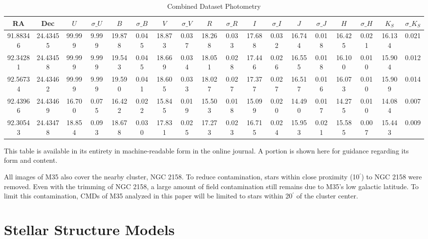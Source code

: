 \documentclass[iop]{emulateapj}
\begin{document}
\begin{table}\tiny
\caption{Combined Dataset Photometry \label{tab:stubtable}}
\begin{tabular}{cccccccccccccccccc}
RA & Dec & $U$ & $\sigma\_U$ & $B$ & $\sigma\_B$ & $V$ & $\sigma\_V$ & $R$ & $\sigma\_R$ & $I$ & $\sigma\_I$ & $J$ & $\sigma\_J$ & $H$ & $\sigma\_H$ & $K_S$ & $\sigma\_K_S$ \\ \hline
   91.88346  &   24.43455 & 99.999 &  9.999 & 19.878 &  0.045 & 18.873 &  0.037 & 18.268 &  0.033 & 17.688 &  0.032 & 16.744 &  0.018 & 16.425 &  0.021 & 16.134 &  0.021 \\
   92.34281  &   24.43458 & 99.999 &  9.999 & 19.543 &  0.045 & 18.669 &  0.034 & 18.051 &  0.028 & 17.446 &  0.026 & 16.555 &  0.018 & 16.100 &  0.010 & 15.904 &  0.012 \\
   92.56734  &   24.43462 & 99.999 &  9.999 & 19.590 &  0.041 & 18.605 &  0.033 & 18.027 &  0.027 & 17.377 &  0.027 & 16.517 &  0.016 & 16.073 &  0.010 & 15.909 &  0.014 \\
   92.43966  &   24.43469 & 16.700 &  0.075 & 16.422 &  0.022 & 15.845 &  0.019 & 15.503 &  0.018 & 15.099 &  0.020 & 14.490 &  0.017 & 14.275 &  0.010 & 14.084 &  0.007 \\
   92.30543  &   24.43478 & 18.854 &  0.093 & 18.678 &  0.030 & 17.831 &  0.025 & 17.273 &  0.023 & 16.715 &  0.024 & 15.953 &  0.021 & 15.585 &  0.007 & 15.443 &  0.009 \\ \hline
\end{tabular}
{\scriptsize This table is available in its entirety in machine-readable form in the online journal. A portion is shown here for guidance regarding its form and content.}
\end{table}

All images of M35 also cover the nearby cluster, NGC 2158. To reduce contamination, stars within close proximity (10$^\prime$) to NGC 2158 were removed. Even with the trimming of NGC 2158, a large amount of field contamination still remains due to M35's low galactic latitude. To limit this contamination, CMDs of M35 analyzed in this paper will be limited to stars within 20$^\prime$ of the cluster center.




\section{Stellar Structure Models} \label{sec:isochrones}
\end{document}
